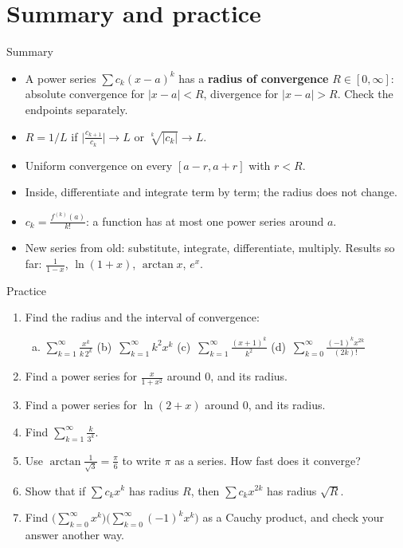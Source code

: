 \documentclass[10pt]{wosm-slides}
\begin{document}
\section{Summary and practice}

\begin{frame}{Summary}
  \begin{itemize}
    \item A power series $\sum c_k (x - a)^k$ has a \textbf{radius of convergence}
      $R \in [0, \infty]$: absolute convergence for $|x - a| < R$, divergence for
      $|x - a| > R$. Check the endpoints separately.
    \item $R = 1/L$ if $\bigl|\frac{c_{k+1}}{c_k}\bigr| \to L$ or $\sqrt[k]{|c_k|} \to L$.
    \item Uniform convergence on every $[a - r, a + r]$ with $r < R$.
    \item Inside, differentiate and integrate term by term; the radius does not change.
    \item $c_k = \frac{f^{(k)}(a)}{k!}$: a function has at most one power series around $a$.
    \item New series from old: substitute, integrate, differentiate, multiply.
      Results so far: $\frac{1}{1-x}$, $\ln(1+x)$, $\arctan x$, $e^x$.
  \end{itemize}
\end{frame}

\begin{frame}{Practice}
  \small
  \begin{enumerate}
    \item Find the radius and the interval of convergence:
      \begin{enumerate}[(a)]
        \item $\sum_{k=1}^\infty \frac{x^k}{k\, 2^k}$ \qquad
          (b)\ $\sum_{k=1}^\infty k^2 x^k$ \qquad
          (c)\ $\sum_{k=1}^\infty \frac{(x+1)^k}{k^2}$ \qquad
          (d)\ $\sum_{k=0}^\infty \frac{(-1)^k x^{2k}}{(2k)!}$
      \end{enumerate}
    \item Find a power series for $\frac{x}{1+x^2}$ around $0$, and its radius.
    \item Find a power series for $\ln(2 + x)$ around $0$, and its radius.
    \item Find $\sum_{k=1}^\infty \frac{k}{3^k}$.
    \item Use $\arctan\frac{1}{\sqrt3} = \frac\pi6$ to write $\pi$ as a series. How fast does it
      converge?
    \item Show that if $\sum c_k x^k$ has radius $R$, then $\sum c_k x^{2k}$ has radius $\sqrt R$.
    \item Find $\bigl(\sum_{k=0}^\infty x^k\bigr)\bigl(\sum_{k=0}^\infty (-1)^k x^k\bigr)$
      as a Cauchy product, and check your answer another way.
  \end{enumerate}
\end{frame}
\end{document}
